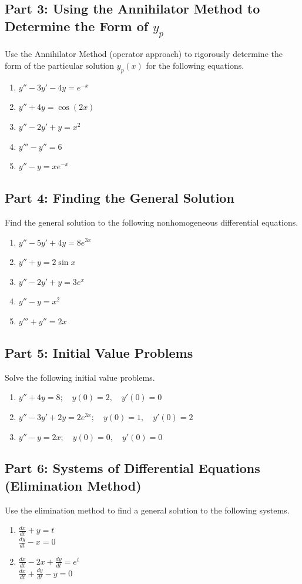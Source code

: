 \documentclass[11pt]{article}
\begin{document}
\subsection*{Part 3: Using the Annihilator Method to Determine the Form of $y_p$}
Use the Annihilator Method (operator approach) to rigorously determine the form of the particular solution $y_p(x)$ for the following equations.
\begin{enumerate}[resume]
    \item $y'' - 3y' - 4y = e^{-x}$
    \item $y'' + 4y = \cos(2x)$
    \item $y'' - 2y' + y = x^2$
    \item $y''' - y'' = 6$
    \item $y'' - y = x e^{-x}$
\end{enumerate}

\subsection*{Part 4: Finding the General Solution}
Find the general solution to the following nonhomogeneous differential equations.
\begin{enumerate}[resume]
    \item $y'' - 5y' + 4y = 8e^{3x}$
    \item $y'' + y = 2 \sin x$
    \item $y'' - 2y' + y = 3e^x$
    \item $y'' - y = x^2$
    \item $y''' + y'' = 2x$
\end{enumerate}

\subsection*{Part 5: Initial Value Problems}
Solve the following initial value problems.
\begin{enumerate}[resume]
    \item $y'' + 4y = 8; \quad y(0) = 2, \quad y'(0) = 0$
    \item $y'' - 3y' + 2y = 2e^{3x}; \quad y(0) = 1, \quad y'(0) = 2$
    \item $y'' - y = 2x; \quad y(0) = 0, \quad y'(0) = 0$
\end{enumerate}

\subsection*{Part 6: Systems of Differential Equations (Elimination Method)}
Use the elimination method to find a general solution to the following systems.
\begin{enumerate}[resume]
    \item $\frac{dx}{dt} + y = t$ \\ $\frac{dy}{dt} - x = 0$
    \item $\frac{dx}{dt} - 2x + \frac{dy}{dt} = e^t$ \\ $\frac{dx}{dt} + \frac{dy}{dt} - y = 0$
\end{enumerate}
\end{document}
